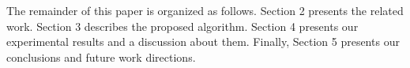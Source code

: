     The remainder of this paper is organized as follows. Section 2 presents the related work. Section 3 describes the proposed algorithm. Section 4 presents our experimental results and a discussion about them. Finally, Section 5 presents our conclusions and future work directions.
    